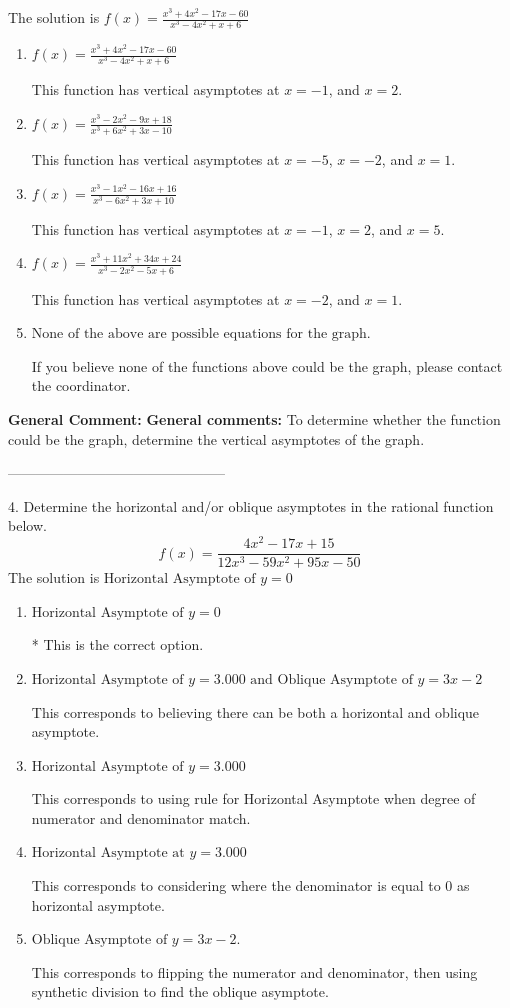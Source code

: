 \documentclass{extbook}[14pt]
\begin{document}
The solution is $ f(x) = \frac{x^{3} +4 x^{2} -17 x -60}{x^{3} -4 x^{2} +x + 6} $ 

\begin{enumerate}[label=\Alph*.] 
\item $ f(x) = \frac{x^{3} +4 x^{2} -17 x -60}{x^{3} -4 x^{2} +x + 6} $ 

 This function has vertical asymptotes at $x=-1$, and $x=2$. 
\item $ f(x) = \frac{x^{3} -2 x^{2} -9 x + 18}{x^{3} +6 x^{2} +3 x -10} $ 

 This function has vertical asymptotes at $x=-5$, $x=-2$, and $x=1$. 
\item $ f(x) = \frac{x^{3} -1 x^{2} -16 x + 16}{x^{3} -6 x^{2} +3 x + 10} $ 

 This function has vertical asymptotes at $x=-1$, $x=2$, and $x=5$. 
\item $ f(x) = \frac{x^{3} +11 x^{2} +34 x + 24}{x^{3} -2 x^{2} -5 x + 6} $ 

 This function has vertical asymptotes at $x=-2$, and $x=1$. 
\item $ \text{None of the above are possible equations for the graph.} $ 

 If you believe none of the functions above could be the graph, please contact the coordinator. 
\end{enumerate} 
 
\textbf{General Comment:} \textbf{General comments:} To determine whether the function could be the graph, determine the vertical asymptotes of the graph. 

-----------------------------------------------

4. Determine the horizontal and/or oblique asymptotes in the rational function below.
\[ f(x) = \frac{4x^{2} -17 x + 15}{12x^{3} -59 x^{2} +95 x -50} \] 
The solution is $ \text{Horizontal Asymptote of } y = 0 $ 

\begin{enumerate}[label=\Alph*.] 
\item $ \text{Horizontal Asymptote of } y = 0 $ 

 * This is the correct option. 
\item $ \text{Horizontal Asymptote of } y = 3.000 \text{ and Oblique Asymptote of } y = 3x -2 $ 

 This corresponds to believing there can be both a horizontal and oblique asymptote. 
\item $ \text{Horizontal Asymptote of } y = 3.000  $ 

 This corresponds to using rule for Horizontal Asymptote when degree of numerator and denominator match. 
\item $ \text{Horizontal Asymptote at } y = 3.000 $ 

 This corresponds to considering where the denominator is equal to 0 as horizontal asymptote. 
\item $ \text{Oblique Asymptote of } y = 3x -2. $ 

 This corresponds to flipping the numerator and denominator, then using synthetic division to find the oblique asymptote. 
\end{enumerate} 
 
\end{document}
